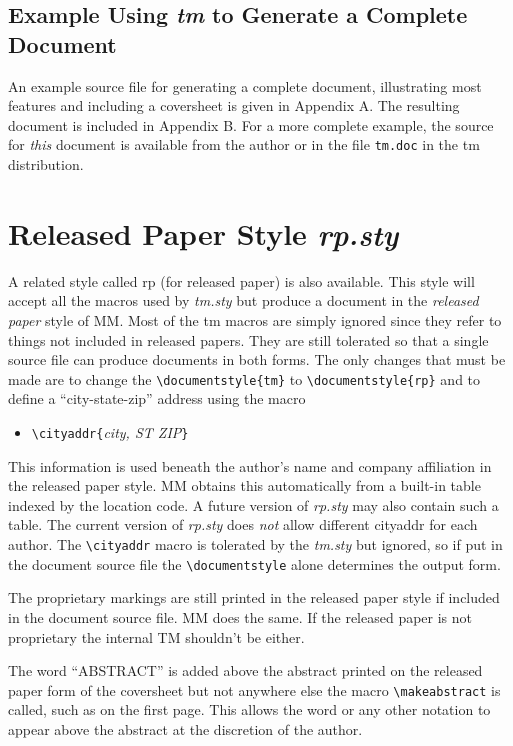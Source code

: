 \subsection{Example Using {\it tm} to Generate a Complete Document}
An example source file for generating a complete document,
illustrating most features and including a coversheet is given in
Appendix A.  The resulting document is included in Appendix B.
For a more complete example, the source for {\it this} document is
available from the author or in the file \verb|tm.doc| in the tm
distribution. 
\section{Released Paper Style {\it rp.sty}}
A related style called rp (for released paper) is also available.
This style will accept all the macros used by {\it tm.sty} but produce a
document in the {\it released paper} style of MM.  Most of the tm
macros are simply ignored since they refer to things not included in
released papers.  They are still tolerated so that a single source
file can produce documents in both forms.  The only changes that must
be made are to change the \verb|\documentstyle{tm}| to
\verb|\documentstyle{rp}| and to define a ``city-state-zip'' address
using the macro
\begin{itemize}
\item[]
\verb|\cityaddr{|{\it city, ST  ZIP}\verb|}|
\end{itemize}
This information is used beneath the author's name and company
affiliation in the released paper style.  MM obtains this
automatically from a built-in table indexed by the location code.  A
future version of {\it rp.sty} may also contain such a table.  The
current version of {\it rp.sty} does {\it not} allow different
cityaddr for each author.  The \verb|\cityaddr| macro is tolerated by
the {\it tm.sty} but ignored, so if put in the document source file
the \verb|\documentstyle| alone determines the output form.

The proprietary markings are still printed in the released paper
style if included in the document source file.  MM does the same.
If the released paper is not proprietary the internal TM shouldn't be
either.  

The word ``ABSTRACT'' is added above the abstract printed on the
released paper form of the coversheet but not anywhere else the macro
\verb|\makeabstract| is called, such as on the first page.  This
allows the word or any other notation to appear above the abstract at the
discretion of the author.

